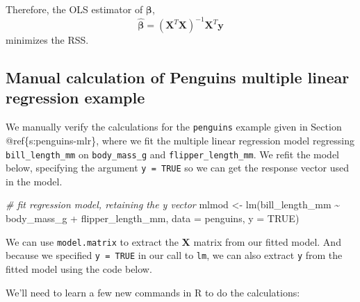 \documentclass[
]{book}
\newenvironment{Shaded}{\begin{snugshade}}{\end{snugshade}}
\newcommand{\AttributeTok}[1]{\textcolor[rgb]{0.77,0.63,0.00}{#1}}
\newcommand{\CommentTok}[1]{\textcolor[rgb]{0.56,0.35,0.01}{\textit{#1}}}
\newcommand{\ConstantTok}[1]{\textcolor[rgb]{0.00,0.00,0.00}{#1}}
\newcommand{\FunctionTok}[1]{\textcolor[rgb]{0.00,0.00,0.00}{#1}}
\newcommand{\NormalTok}[1]{#1}
\newcommand{\OtherTok}[1]{\textcolor[rgb]{0.56,0.35,0.01}{#1}}
\newcommand{\SpecialCharTok}[1]{\textcolor[rgb]{0.00,0.00,0.00}{#1}}
\theoremstyle{definition}
\theoremstyle{definition}
\theoremstyle{definition}
\theoremstyle{definition}
\theoremstyle{remark}
\begin{document}
Therefore, the OLS estimator of \(\boldsymbol{\beta}\),
\[\hat{\boldsymbol{\beta}}=(\mathbf{X}^T\mathbf{X})^{-1}\mathbf{X}^T\mathbf{y}\]
minimizes the RSS.

\hypertarget{manual-calculation-of-penguins-multiple-linear-regression-example}{%
\subsection{Manual calculation of Penguins multiple linear regression example}\label{manual-calculation-of-penguins-multiple-linear-regression-example}}

We manually verify the calculations for the \texttt{penguins} example given in Section @ref\{s:penguins-mlr\}, where we fit the multiple linear regression model regressing \texttt{bill\_length\_mm} on \texttt{body\_mass\_g} and \texttt{flipper\_length\_mm}. We refit the model below, specifying the argument \texttt{y\ =\ TRUE} so we can get the response vector used in the model.

\begin{Shaded}
\begin{Highlighting}[]
\CommentTok{\# fit regression model, retaining the y vector}
\NormalTok{mlmod }\OtherTok{\textless{}{-}} \FunctionTok{lm}\NormalTok{(bill\_length\_mm }\SpecialCharTok{\textasciitilde{}}\NormalTok{ body\_mass\_g }\SpecialCharTok{+}\NormalTok{ flipper\_length\_mm,}
            \AttributeTok{data =}\NormalTok{ penguins, }\AttributeTok{y =} \ConstantTok{TRUE}\NormalTok{)}
\end{Highlighting}
\end{Shaded}

We can use \texttt{model.matrix} to extract the \(\mathbf{X}\) matrix from our fitted model. And because we specified \texttt{y\ =\ TRUE} in our call to \texttt{lm}, we can also extract \texttt{y} from the fitted model using the code below.

\begin{Shaded}
\end{Shaded}

We'll need to learn a few new commands in R to do the calculations:
\end{document}
